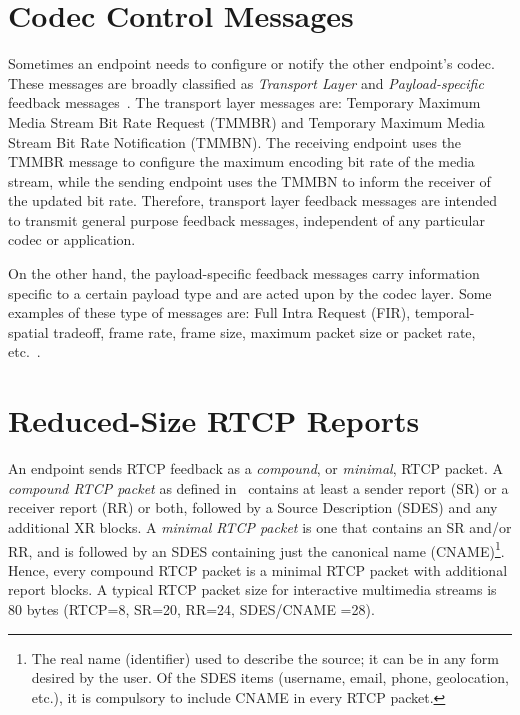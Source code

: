 

\section{Codec Control Messages}

Sometimes an endpoint needs to configure or notify the other endpoint's codec.
These messages are broadly classified as \emph{Transport Layer} and \emph
{Payload-specific} feedback messages~\cite{rfc4585, rfc5104}. The transport
layer messages are: Temporary Maximum Media Stream Bit Rate Request (TMMBR)
and Temporary Maximum Media Stream Bit Rate Notification (TMMBN). The
receiving endpoint uses the TMMBR message to configure the maximum encoding
bit rate of the media stream, while the sending endpoint uses the TMMBN to
inform the receiver of the updated bit rate. Therefore, transport layer
feedback messages are intended to transmit general purpose feedback messages,
independent of any particular codec or application.

On the other hand, the payload-specific feedback messages carry information
specific to a certain payload type and are acted upon by the codec layer. Some
examples of these type of messages are: Full Intra Request (FIR),
temporal-spatial tradeoff, frame rate, frame size, maximum packet size or packet rate,
etc.~\cite{draft.avt.cop}.

\section{Reduced-Size RTCP Reports}

An endpoint sends RTCP feedback as a \emph{compound}, or \emph{minimal}, RTCP
packet. A \emph{compound RTCP packet} as defined in~\cite{rfc3585} contains
at least a sender report (SR) or a receiver report (RR) or both, followed by
a Source Description (SDES) and any additional XR blocks. A \emph{minimal RTCP
packet} is one that contains an SR and/or RR, and is followed by an SDES
containing just the canonical name (CNAME)\footnote{The real name
(identifier) used to describe the source; it can be in any form desired by the
user. Of the SDES items (username, email, phone, geolocation, etc.), it is
compulsory to include CNAME in every RTCP packet.}. Hence, every compound RTCP
packet is a minimal RTCP packet with additional report blocks. A typical RTCP
packet size for interactive multimedia streams is 80 bytes (RTCP=8, SR=20,
RR=24, SDES/CNAME =28).

